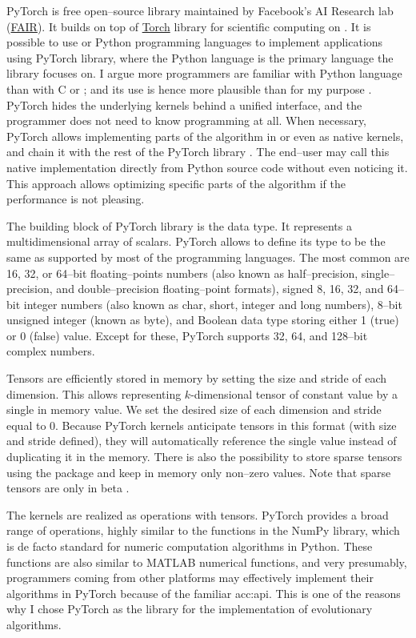 PyTorch is free open--source library maintained by Facebook's AI Research lab (\href{https://ai.facebook.com/}{FAIR}). It builds on top of \href{http://torch.ch/}{Torch} library for scientific computing on \gpuns. It is possible to use \cpp or Python programming languages to implement applications using PyTorch library, where the Python language is the primary language the library focuses on. I argue more programmers are familiar with Python language than with C or \cppns; and its use is hence more plausible than \cuda for my purpose \citep{StackOverflowSurvey}. PyTorch hides the underlying kernels behind a unified interface, and the programmer does not need to know \cuda programming at all. When necessary, PyTorch allows implementing parts of the algorithm in \cpp or even as native \cuda kernels, and chain it with the rest of the PyTorch library \citep{PyTorchDoc}. The end--user may call this native implementation directly from Python source code without even noticing it. This approach allows optimizing specific parts of the algorithm if the performance is not pleasing.

The building block of PyTorch library is the  data type. It represents a multidimensional array of scalars. PyTorch allows to define its type to be the same as supported by most of the programming languages. The most common are 16, 32, or 64--bit floating--points numbers (also known as half--precision, single--precision, and double--precision floating--point formats), signed 8, 16, 32, and 64--bit integer numbers (also known as char, short, integer and long numbers), 8--bit unsigned integer (known as byte), and Boolean data type storing either 1 (true) or 0 (false) value. Except for these, PyTorch supports 32, 64, and 128--bit complex numbers.

Tensors are efficiently stored in memory by setting the size and stride of each dimension. This allows representing $k$-dimensional tensor of constant value by a single in memory value. We set the desired size of each dimension and stride equal to $0$. Because PyTorch kernels anticipate tensors in this format (with size and stride defined), they will automatically reference the single value instead of duplicating it in the memory. There is also the possibility to store sparse tensors using the  package and keep in memory only non--zero values. Note that sparse tensors are only in beta \citep{PyTorchDoc}.

The kernels are realized as operations with tensors. PyTorch provides a broad range of operations, highly similar to the functions in the NumPy library, which is de facto standard for numeric computation algorithms in Python. These functions are also similar to MATLAB numerical functions, and very presumably, programmers coming from other platforms may effectively implement their algorithms in PyTorch because of the familiar \acrshort{acc:api}. This is one of the reasons why I chose PyTorch as the library for the implementation of evolutionary algorithms.

